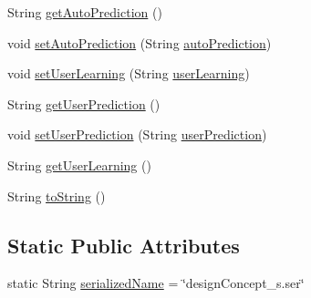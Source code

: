 \begin{DoxyCompactItemize}
\item 
String \hyperlink{classit_1_1isislab_1_1masonassisteddocumentation_1_1_o_d_d_1_1_design_concepts_a895614b33e13c896a110b69f73a40d59}{get\-Auto\-Prediction} ()
\item 
void \hyperlink{classit_1_1isislab_1_1masonassisteddocumentation_1_1_o_d_d_1_1_design_concepts_abbc9031587ae9e9f046a0f31aafd7ee1}{set\-Auto\-Prediction} (String \hyperlink{classit_1_1isislab_1_1masonassisteddocumentation_1_1_o_d_d_1_1_design_concepts_a7fd3d2b194e35f59ccbec8d12ec2f342}{auto\-Prediction})
\item 
void \hyperlink{classit_1_1isislab_1_1masonassisteddocumentation_1_1_o_d_d_1_1_design_concepts_acd1b21cf5ed665ceed8eaa8ab094cfa7}{set\-User\-Learning} (String \hyperlink{classit_1_1isislab_1_1masonassisteddocumentation_1_1_o_d_d_1_1_design_concepts_ac6c8171c9c2941aab4c9fc0a7061f668}{user\-Learning})
\item 
String \hyperlink{classit_1_1isislab_1_1masonassisteddocumentation_1_1_o_d_d_1_1_design_concepts_af0cab8b67f33a90d945f2cde505bec44}{get\-User\-Prediction} ()
\item 
void \hyperlink{classit_1_1isislab_1_1masonassisteddocumentation_1_1_o_d_d_1_1_design_concepts_a1bc66e217cc8edd1dee94365d26ee3f5}{set\-User\-Prediction} (String \hyperlink{classit_1_1isislab_1_1masonassisteddocumentation_1_1_o_d_d_1_1_design_concepts_a189437aa5758364e02fa97e8ac556cbc}{user\-Prediction})
\item 
String \hyperlink{classit_1_1isislab_1_1masonassisteddocumentation_1_1_o_d_d_1_1_design_concepts_af626c1c092b7eddfbb671514e8feba76}{get\-User\-Learning} ()
\item 
String \hyperlink{classit_1_1isislab_1_1masonassisteddocumentation_1_1_o_d_d_1_1_design_concepts_ab2ce9b59335e8629f53d9273bc6e7c40}{to\-String} ()
\end{DoxyCompactItemize}
\subsection*{Static Public Attributes}
\begin{DoxyCompactItemize}
\item 
static String \hyperlink{classit_1_1isislab_1_1masonassisteddocumentation_1_1_o_d_d_1_1_design_concepts_aaacf216faed889dd6ec4a9acd7f29165}{serialized\-Name} = \char`\"{}design\-Concept\-\_\-s.\-ser\char`\"{}
\end{DoxyCompactItemize}
